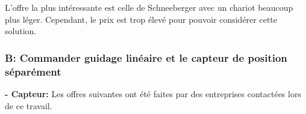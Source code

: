 \begin{table}[H]
  \centering
  \caption{Offres pour le guidage linéaire avec mesure de position}
  \label{tab:OffreGuidPos}
\end{table}

L'offre la plus intéressante est celle de Schneeberger \cite{Schneeberger} avec un chariot beaucoup plus léger. Cependant, le prix est trop élevé pour pouvoir considérer cette solution.

\subsubsection{B: Commander guidage linéaire et le capteur de position séparément}
\textbf{ - Capteur:}
\newline
Les offres suivantes ont été faites par des entreprises contactées lors de ce travail.

\begin{table}[H]
  \centering
  \caption{Offres pour le capteur pour la mesure de position}
  \label{tab:OffrePos}
\end{table}

